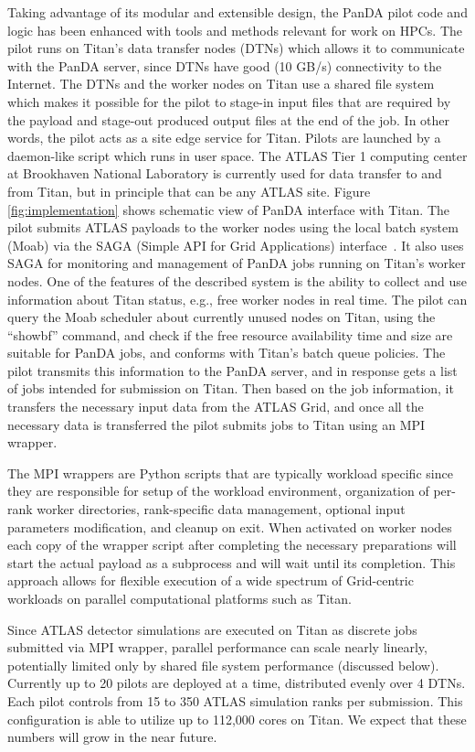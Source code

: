 Taking advantage of its modular and extensible design, the PanDA pilot code and
logic has been enhanced with tools and methods relevant for work on HPCs. The
pilot runs on Titan's data transfer nodes (DTNs) which allows it to communicate
with the PanDA server, since DTNs have good (10 GB/s) connectivity to the
Internet. The DTNs and the worker nodes on Titan use a shared file system which
makes it possible for the pilot to stage-in input files that are required by
the payload and stage-out produced output files at the end of the job. In other
words, the pilot acts as a site edge service for Titan. Pilots are launched by
a daemon-like script which runs in user space. The ATLAS Tier 1 computing
center at Brookhaven National Laboratory is currently used for data transfer to
and from Titan, but in principle that can be any ATLAS site. Figure
\ref{fig:implementation} shows schematic view of PanDA interface with Titan.
The pilot submits ATLAS payloads to the worker nodes using the local batch
system (Moab) via the SAGA (Simple API for Grid Applications) interface~\cite{radical-saga_url}. It also uses SAGA for monitoring and management of PanDA jobs
running on Titan's worker nodes. 
One of the features of the described system is
the ability to collect and use information about Titan status, e.g., free
worker nodes in real time. The pilot can query the Moab scheduler about
currently unused nodes on Titan, using the ``showbf'' command, and check if the
free resource availability time and size are suitable for PanDA jobs, and
conforms with Titan's batch queue policies. The pilot transmits this
information to the PanDA server, and in response gets a list of jobs intended
for submission on Titan. Then based on the job information, it transfers the
necessary input data from the ATLAS Grid, and once all the necessary data is
transferred the pilot submits jobs to Titan using an MPI wrapper.

The MPI wrappers are Python scripts that are typically workload specific since
they are responsible for setup of the workload environment, organization of
per-rank worker directories, rank-specific data management, optional input
parameters modification, and cleanup on exit. When activated on worker nodes
each copy of the wrapper script after completing the necessary preparations
will start the actual payload as a subprocess and will wait until its
completion. This approach allows for flexible execution of a wide spectrum of
Grid-centric workloads on parallel computational platforms such as Titan.

Since ATLAS detector simulations are executed on Titan as discrete jobs
submitted via MPI wrapper, parallel performance can scale nearly linearly,
potentially limited only by shared file system performance (discussed below).
Currently up to 20 pilots are deployed at a time, distributed evenly over 4
DTNs. Each pilot controls from 15 to 350 ATLAS simulation ranks per submission.
This configuration is able to utilize up to 112,000 cores on Titan. We expect
that these numbers will grow in the near future.

